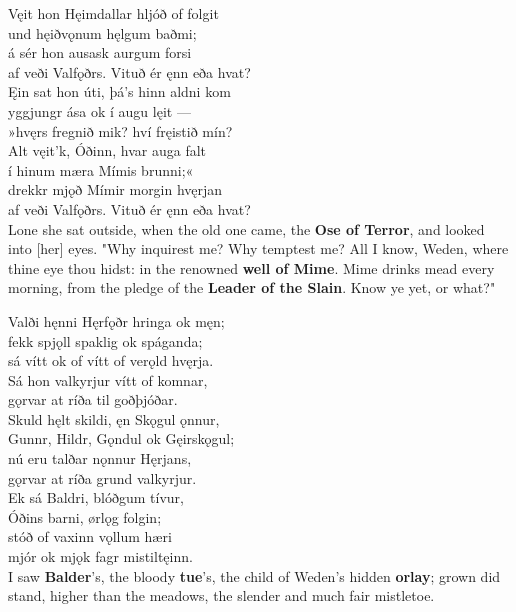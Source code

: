 \bva Vęit hon Hęimdallar \hld hljóð of folgit \\%
und hęiðvǫnum \hld hęlgum baðmi; \\%
á sér hon ausask \hld aurgum forsi \\%
af veði Valfǫðrs. \hld Vituð ér ęnn eða hvat?\\%

\bva Ęin sat hon úti, \hld þá's hinn aldni kom \\%
yggjungr ása \hld ok í augu lęit — \\%
»hvęrs fregnið mik? \hld hví fręistið mín? \\%
Alt vęit'k, Óðinn, \hld hvar auga falt \\%
í hinum mæra \hld Mímis brunni;« \\%
drekkr mjǫð Mímir \hld morgin hvęrjan \\%
af veði Valfǫðrs. \hld Vituð ér ęnn eða hvat?\\%

\bvb Lone she sat outside, when the old one came, the \textbf{Ose of Terror}, and looked into [her] eyes. "Why inquirest me? Why temptest me? All I know, Weden, where thine eye thou hidst: in the renowned \textbf{well of Mime}. Mime drinks mead every morning, from the pledge of the \textbf{Leader of the Slain}. Know ye yet, or what?"

\bva Valði hęnni Hęrfǫðr \hld hringa ok męn; \\%
fekk spjǫll spaklig \hld ok spáganda; \\%
sá vítt ok of vítt \hld of verǫld hvęrja.\\%

\bva Sá hon valkyrjur \hld vítt of komnar, \\%
gǫrvar at ríða \hld til goðþjóðar. \\%
Skuld hęlt skildi, \hld ęn Skǫgul ǫnnur, \\%
Gunnr, Hildr, Gǫndul \hld ok Gęirskǫgul; \\%
nú eru talðar \hld nǫnnur Hęrjans, \\%
gǫrvar at ríða \hld grund valkyrjur.\\%

\bva Ek sá Baldri, \hld blóðgum tívur, \\%
Óðins barni, \hld ørlǫg folgin; \\%
stóð of vaxinn \hld vǫllum hæri \\%
mjór ok mjǫk fagr \hld mistiltęinn.\\%

\bvb I saw \textbf{Balder}'s, the bloody \textbf{tue}'s, the child of Weden's hidden \textbf{orlay}; grown did stand, higher than the meadows, the slender and much fair mistletoe.

